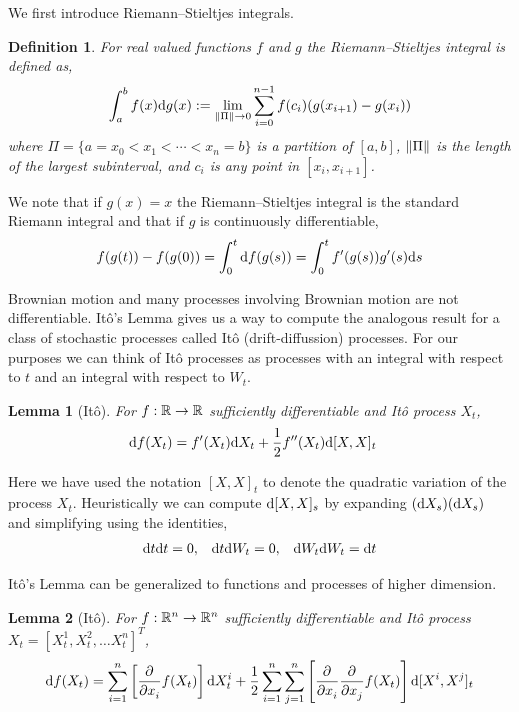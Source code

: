 \documentclass[12pt]{article}
\newtheorem*{lemma}{Lemma}
\newtheorem*{definition}{Definition}
\begin{document}
We first introduce Riemann--Stieltjes integrals.

\begin{definition}
For real valued functions \( f \) and \( g \) the Riemann--Stieltjes integral is defined as,
\begin{align*}
    \int_{a}^{b} f(x) \mathrm{d} g(x) := \lim\limits_{\left\lVert\Pi\right\rVert\to 0} \sum_{i=0}^{n-1} f(c_i)(g(x_{i+1}) - g(x_i))
\end{align*}
where \( \Pi = \{a=x_0<x_1 < \cdots < x_n = b\} \) is a partition of \( [a,b] \), \( \left\lVert\Pi\right\rVert \) is the length of the largest subinterval, and \( c_i \) is any point in \( [x_i,x_{i+1}] \).
\end{definition}

We note that if \( g(x) = x \) the Riemann--Stieltjes integral is the standard Riemann integral and that if \( g \) is continuously differentiable,
\begin{align*}
    f(g(t)) - f(g(0)) = \int_0^t \mathrm{d} f(g(s)) = \int_0^t f'(g(s))g'(s) \mathrm{d} s
\end{align*}

Brownian motion and many processes involving Brownian motion are not differentiable. It\^o's Lemma gives us a way to compute the analogous result for a class of stochastic processes called It\^o (drift-diffussion) processes. For our purposes we can think of It\^o processes as processes with an integral with respect to \( t \) and an integral with respect to \( W_t \).

\begin{lemma}[It\^o] For \( f:\mathbb{R}\to\mathbb{R} \) sufficiently differentiable and It\^o process \( X_t \),
\begin{align}
    \d f(X_t) &=  f'(X_t)\d X_t + \dfrac{1}{2}f''(X_t)\d[X,X]_t %
\end{align}
\end{lemma}
Here we have used the notation \( [X,X]_t \) to denote the quadratic variation of the process \( X_t \). Heuristically we can compute \( \mathrm{d}[X,X]_s \) by expanding  \( (\mathrm{d} X_s)(\mathrm{d} X_s) \) and simplifying using the identities,
\begin{align}
    \mathrm{d} t \mathrm{d} t = 0, && \mathrm{d} t \mathrm{d} W_t = 0, && \mathrm{d} W_t \mathrm{d} W_t = \mathrm{d} t \label{heuristics}
\end{align}


It\^o's Lemma can be generalized to functions and processes of higher dimension.
\begin{lemma}[It\^o] For \( f:\mathbb{R}^n\to\mathbb{R}^n \) sufficiently differentiable and It\^o process \( X_t = [X_t^1, X_t^2, \ldots X_t^n]^T \),
\begin{align}
    \mathrm{d} f(X_t) = \sum_{i=1}^{n} \left[\frac{\partial^{}}{\partial x_i^{}}f(X_t)\right] \mathrm{d} X_t^i + \dfrac{1}{2} \sum_{i=1}^{n} \sum_{j=1}^{n}\left[ \frac{\partial^{}}{\partial x_i^{}} \frac{\partial^{}}{\partial x_j^{}} f(X_t) \right] \mathrm{d} [X^i,X^j]_t \label{itond}
\end{align}
\end{lemma}
\end{document}
